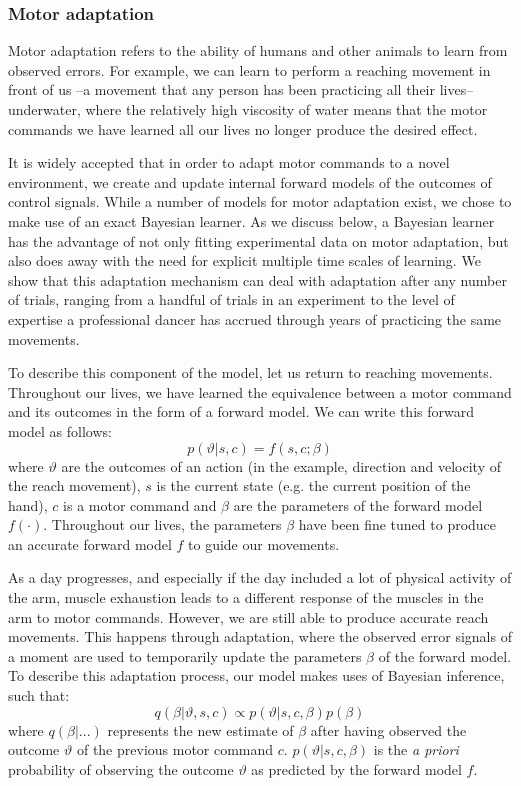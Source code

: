 \documentclass[a4paper,doc,floatsintext,natbib]{apa6}
\begin{document}
\subsubsection{Motor adaptation}
Motor adaptation refers to the ability of humans and other animals to learn from observed errors. For example, we can learn to perform a reaching movement in front of us --a movement that any person has been practicing all their lives-- underwater, where the relatively high viscosity of water means that the motor commands we have learned all our lives no longer produce the desired effect.

It is widely accepted that in order to adapt motor commands to a novel environment, we create and update internal forward models of the outcomes of control signals. While a number of models for motor adaptation exist, we chose to make use of an exact Bayesian learner. As we discuss below, a Bayesian learner has the advantage of not only fitting experimental data on motor adaptation, but also does away with the need for explicit multiple time scales of learning. We show that this adaptation mechanism can deal with adaptation after any number of trials, ranging from a handful of trials in an experiment to the level of expertise a professional dancer has accrued through years of practicing the same movements.

To describe this component of the model, let us return to reaching movements. Throughout our lives, we have learned the equivalence between a motor command and its outcomes in the form of a forward model. We can write this forward model as follows:
\begin{equation}
p(\vartheta | s, c) = f(s, c; \beta)
\end{equation}
where $\vartheta$ are the outcomes of an action (in the example, direction and velocity of the reach movement), $s$ is the current state (e.g. the current position of the hand), $c$ is a motor command and $\beta$ are the parameters of the forward model $f(\cdot)$. Throughout our lives, the parameters $\beta$ have been fine tuned to produce an accurate forward model $f$ to guide our movements.

As a day progresses, and especially if the day included a lot of physical activity of the arm, muscle exhaustion leads to a different response of the muscles in the arm to motor commands. However, we are still able to produce accurate reach movements. This happens through adaptation, where the observed error signals of a moment are used to temporarily update the parameters $\beta$ of the forward model. To describe this adaptation process, our model makes uses of Bayesian inference, such that:
\begin{equation}
q(\beta | \vartheta, s, c) \propto p(\vartheta | s, c, \beta)p(\beta)
\end{equation}
where $q(\beta | ...)$ represents the new estimate of $\beta$ after having observed the outcome $\vartheta$ of the previous motor command $c$. $p(\vartheta | s, c, \beta)$ is the \textit{a priori} probability of observing the outcome $\vartheta$ as predicted by the forward model $f$.
\end{document}

